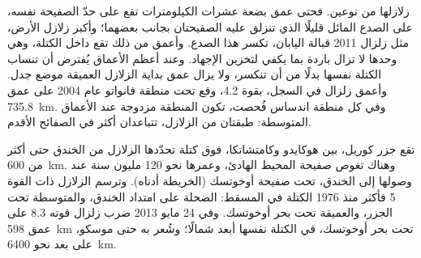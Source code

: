 زلازلها من نوعين. فحتى عمق بضعة عشرات الكيلومترات تقع على حدّ الصفيحة نفسه، على الصدع المائل قليلًا الذي تنزلق عليه الصفيحتان بجانب بعضهما؛ وأكبر زلازل الأرض، مثل زلزال 2011 قبالة اليابان، تكسر هذا الصدع. وأعمق من ذلك تقع داخل الكتلة، وهي وحدها لا تزال باردة بما يكفي لتخزين الإجهاد. وعند أعظم الأعماق يُفترض أن تنساب الكتلة نفسها بدلًا من أن تنكسر، ولا يزال عمق بداية الزلازل العميقة موضع جدل. وأعمق زلزال في السجل، بقوة 4.2، وقع تحت منطقة فانواتو عام 2004 على عمق \qty{735.8}{km}. وفي كل منطقة اندساس فُحصت، تكون المنطقة مزدوجة عند الأعماق المتوسطة: طبقتان من الزلازل، تتباعدان أكثر في الصفائح الأقدم.

تقع جزر كوريل، بين هوكايدو وكامتشاتكا، فوق كتلة تحدّدها الزلازل من الخندق حتى أكثر من \qty{600}{km}. وهناك تغوص صفيحة المحيط الهادئ، وعمرها نحو 120 مليون سنة عند وصولها إلى الخندق، تحت صفيحة أوخوتسك (الخريطة أدناه). وترسم الزلازل ذات القوة 5 فأكثر منذ 1976 الكتلة في المسقط: الضحلة على امتداد الخندق، والمتوسطة تحت الجزر، والعميقة تحت بحر أوخوتسك. وفي 24 مايو 2013 ضرب زلزال قوته 8.3 على عمق \qty{598}{km} تحت بحر أوخوتسك، في الكتلة نفسها أبعد شمالًا؛ وشُعر به حتى موسكو، على بعد نحو \qty{6400}{km}.

